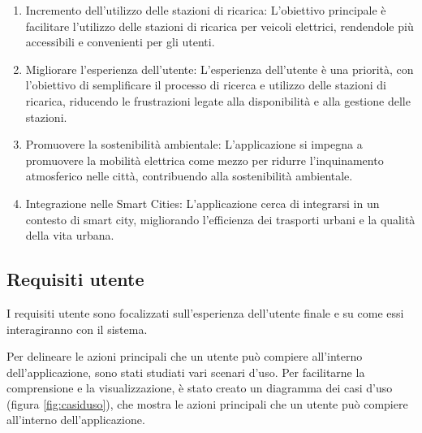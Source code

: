 \begin{enumerate}
    \item Incremento dell'utilizzo delle stazioni di ricarica: L'obiettivo principale è
          facilitare l'utilizzo delle stazioni di ricarica per veicoli elettrici, rendendole più
          accessibili e convenienti per gli utenti.

    \item Migliorare l'esperienza dell'utente: L'esperienza dell'utente è una priorità,
          con l'obiettivo di semplificare il processo di ricerca e utilizzo delle stazioni di
          ricarica, riducendo le frustrazioni legate alla disponibilità e alla gestione delle stazioni.

    \item Promuovere la sostenibilità ambientale: L'applicazione si impegna a promuovere
          la mobilità elettrica come mezzo per ridurre l'inquinamento atmosferico nelle città,
          contribuendo alla sostenibilità ambientale.

    \item Integrazione nelle Smart Cities: L'applicazione cerca di integrarsi in un contesto
          di smart city, migliorando l'efficienza dei trasporti urbani e la qualità della vita urbana.
\end{enumerate}

\subsection{Requisiti utente}
I requisiti utente sono focalizzati sull'esperienza dell'utente finale e su come essi
interagiranno con il sistema.

Per delineare le azioni principali che un utente può compiere all'interno dell'applicazione,
sono stati studiati vari scenari d'uso.
Per facilitarne la comprensione e la visualizzazione, è stato creato un diagramma dei casi
d'uso (figura \ref{fig:casiduso}), che mostra le azioni principali che un utente può compiere
all'interno dell'applicazione.

